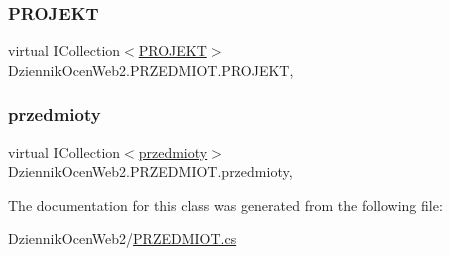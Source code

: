 \subsubsection{\texorpdfstring{P\+R\+O\+J\+E\+KT}{PROJEKT}}
{\footnotesize\ttfamily virtual I\+Collection$<$\hyperlink{class_dziennik_ocen_web2_1_1_p_r_o_j_e_k_t}{P\+R\+O\+J\+E\+KT}$>$ Dziennik\+Ocen\+Web2.\+P\+R\+Z\+E\+D\+M\+I\+O\+T.\+P\+R\+O\+J\+E\+KT\hspace{0.3cm}{\ttfamily [get]}, {\ttfamily [set]}}

\mbox{\label{class_dziennik_ocen_web2_1_1_p_r_z_e_d_m_i_o_t_a80f868563e700244e033a8a7ab2a48ee}} 
\subsubsection{\texorpdfstring{przedmioty}{przedmioty}}
{\footnotesize\ttfamily virtual I\+Collection$<$\hyperlink{class_dziennik_ocen_web2_1_1przedmioty}{przedmioty}$>$ Dziennik\+Ocen\+Web2.\+P\+R\+Z\+E\+D\+M\+I\+O\+T.\+przedmioty\hspace{0.3cm}{\ttfamily [get]}, {\ttfamily [set]}}



The documentation for this class was generated from the following file\+:\begin{DoxyCompactItemize}
\item 
Dziennik\+Ocen\+Web2/\hyperlink{_p_r_z_e_d_m_i_o_t_8cs}{P\+R\+Z\+E\+D\+M\+I\+O\+T.\+cs}\end{DoxyCompactItemize}
